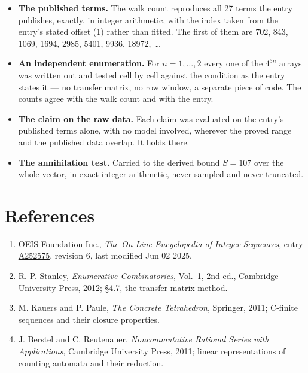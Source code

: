 \documentclass[11pt]{article}
\theoremstyle{definition}
\begin{document}
\begin{itemize}

\item {\bfseries The published terms.} The walk count reproduces all 27 terms the entry publishes, exactly, in integer arithmetic, with the index taken from the entry's stated offset (1) rather than fitted. The first of them are 702, 843, 1069, 1694, 2985, 5401, 9936, 18972,~\dots

\item {\bfseries An independent enumeration.} For $n = 1,\dots,2$ every one of the $4^{3n}$ arrays was written out and tested cell by cell against the condition as the entry states it --- no transfer matrix, no row window, a separate piece of code. The counts agree with the walk count and with the entry.

\item {\bfseries The claim on the raw data.} Each claim was evaluated on the entry's published terms alone, with no model involved, wherever the proved range and the published data overlap. It holds there.

\item {\bfseries The annihilation test.} Carried to the derived bound $S = 107$ over the whole vector, in exact integer arithmetic, never sampled and never truncated.

\end{itemize}

\section{References}

\begin{enumerate}

\item OEIS Foundation Inc., \emph{The On-Line Encyclopedia of Integer Sequences}, entry \href{https://oeis.org/A252575}{A252575}, revision 6, last modified Jun 02 2025.

\item R. P. Stanley, \emph{Enumerative Combinatorics}, Vol.~1, 2nd ed., Cambridge University Press, 2012; \S4.7, the transfer-matrix method.

\item M. Kauers and P. Paule, \emph{The Concrete Tetrahedron}, Springer, 2011; C-finite sequences and their closure properties.

\item J. Berstel and C. Reutenauer, \emph{Noncommutative Rational Series with Applications}, Cambridge University Press, 2011; linear representations of counting automata and their reduction.

\end{enumerate}
\end{document}
